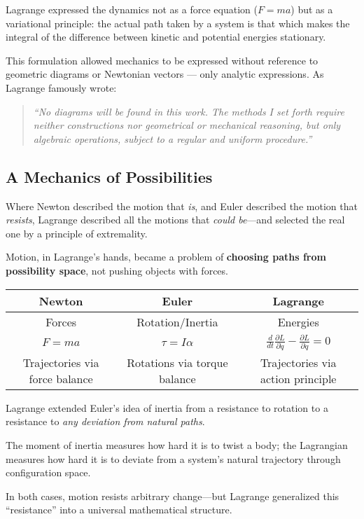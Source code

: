 \medskip

Lagrange expressed the dynamics not as a force equation (\( F = ma \)) but as a variational principle: the actual path taken by a system is that which makes the integral of the difference between kinetic and potential energies stationary.

\medskip

This formulation allowed mechanics to be expressed without reference to geometric diagrams or Newtonian vectors — only analytic expressions. As Lagrange famously wrote:

\begin{quote}
\textit{“No diagrams will be found in this work. The methods I set forth require neither constructions nor geometrical or mechanical reasoning, but only algebraic operations, subject to a regular and uniform procedure.”}
\end{quote}


\subsection{A Mechanics of Possibilities}

Where Newton described the motion that \textit{is}, and Euler described the motion that \textit{resists}, Lagrange described all the motions that \textit{could be}—and selected the real one by a principle of extremality.

Motion, in Lagrange’s hands, became a problem of \textbf{choosing paths from possibility space}, not pushing objects with forces.

\begin{center}
\begin{tabular}{c|c|c}
\textbf{Newton} & \textbf{Euler} & \textbf{Lagrange} \\
\hline
Forces & Rotation/Inertia & Energies \\
\( F = ma \) & \( \tau = I \alpha \) & \( \frac{d}{dt} \frac{\partial L}{\partial \dot{q}} - \frac{\partial L}{\partial q} = 0 \) \\
Trajectories via force balance & Rotations via torque balance & Trajectories via action principle \\
\end{tabular}
\end{center}

\begin{tcolorbox}[colback=blue!5!white, colframe=blue!50!black, 
  title={Historical Sidebar: From Inertia to Extremality}]
  
Lagrange extended Euler’s idea of inertia from a resistance to rotation to a resistance to \textit{any deviation from natural paths}.

The moment of inertia measures how hard it is to twist a body; the Lagrangian measures how hard it is to deviate from a system’s natural trajectory through configuration space.

In both cases, motion resists arbitrary change—but Lagrange generalized this “resistance” into a universal mathematical structure.
\end{tcolorbox}



